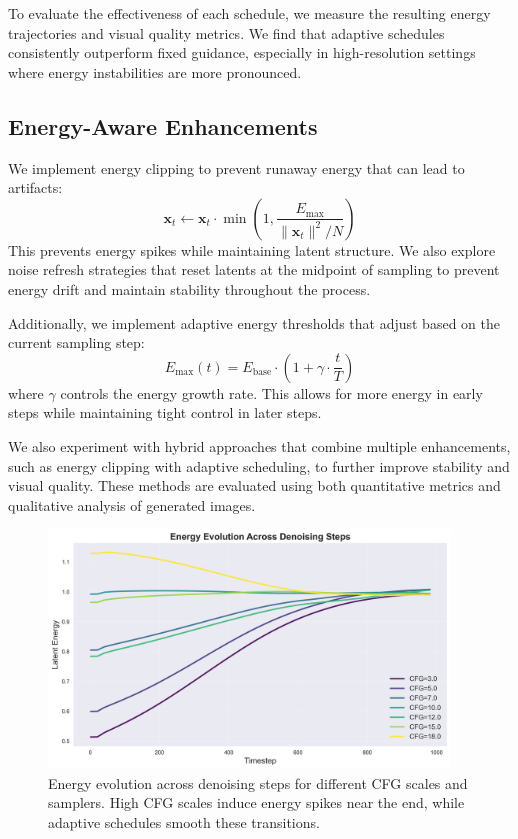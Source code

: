 \documentclass[10pt,twocolumn]{article}
\begin{document}
To evaluate the effectiveness of each schedule, we measure the resulting energy trajectories and visual quality metrics. We find that adaptive schedules consistently outperform fixed guidance, especially in high-resolution settings where energy instabilities are more pronounced.

\subsection{Energy-Aware Enhancements}
We implement energy clipping to prevent runaway energy that can lead to artifacts:
\begin{equation}
\mathbf{x}_t \leftarrow \mathbf{x}_t \cdot \min\left(1, \frac{E_{\text{max}}}{\|\mathbf{x}_t\|^2/N}\right)
\end{equation}
This prevents energy spikes while maintaining latent structure. We also explore noise refresh strategies that reset latents at the midpoint of sampling to prevent energy drift and maintain stability throughout the process.

Additionally, we implement adaptive energy thresholds that adjust based on the current sampling step:
\begin{equation}
E_{\text{max}}(t) = E_{\text{base}} \cdot (1 + \gamma \cdot \frac{t}{T})
\end{equation}
where $\gamma$ controls the energy growth rate. This allows for more energy in early steps while maintaining tight control in later steps.

We also experiment with hybrid approaches that combine multiple enhancements, such as energy clipping with adaptive scheduling, to further improve stability and visual quality. These methods are evaluated using both quantitative metrics and qualitative analysis of generated images.

\begin{figure}[t]
    \centering
    \includegraphics[width=0.95\textwidth]{figures/figure1_energy_evolution.png}
    \caption{Energy evolution across denoising steps for different CFG scales and samplers. High CFG scales induce energy spikes near the end, while adaptive schedules smooth these transitions.}
    \label{fig:energy_evolution}
\end{figure}
\end{document}
